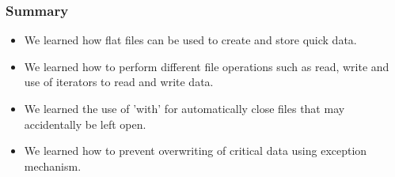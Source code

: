 \documentclass{beamer}
\begin{document}
\begin{frame}
\frametitle{Summary}
\begin{itemize}
\item We learned how flat files can be used to create and store quick data.
\item We learned how to perform different file operations such as read, write and use of iterators to read and write data.
\item We learned the use of 'with' for automatically close files that may accidentally be left open.
\item We learned how to prevent overwriting of critical data using exception mechanism.
\end{itemize}
\end{frame}
\end{document}
